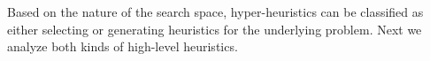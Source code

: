 \documentclass[conference]{IEEEtran}
\begin{document}


Based on the nature of the search space,  hyper-heuristics can be classified  \cite{burke2010classification} as either selecting or generating heuristics for the underlying problem. Next we analyze both kinds of high-level heuristics.
\end{document}
